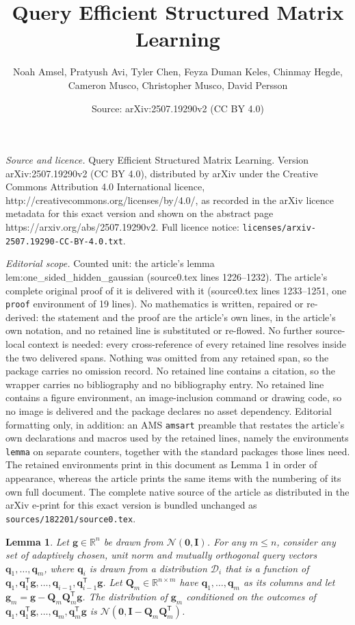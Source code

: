 \documentclass[10pt,a4paper]{amsart}
\title{Query Efficient Structured Matrix Learning}
\author{Noah Amsel, Pratyush Avi, Tyler Chen, Feyza Duman Keles, Chinmay Hegde, Cameron Musco, Christopher Musco, David Persson}
\date{Source: arXiv:2507.19290v2 (CC BY 4.0)}
\newtheorem{lemma}{Lemma}
\newcommand{\R}{\mathbb{R}}
\newcommand{\bv}[1]{\boldsymbol{\mathbf{#1}}}
\newcommand{\transpose}{\mathsf{T}}
\begin{document}
\maketitle

\noindent\emph{Source and licence.} Query Efficient Structured Matrix Learning. Version arXiv:2507.19290v2 (CC BY 4.0), distributed by arXiv under the Creative Commons Attribution 4.0 International licence, http://creativecommons.org/licenses/by/4.0/, as recorded in the arXiv licence metadata for this exact version and shown on the abstract page https://arxiv.org/abs/2507.19290v2. Full licence notice: \texttt{licenses/arxiv-2507.19290-CC-BY-4.0.txt}.\par\smallskip

\noindent\textit{Editorial scope.} Counted unit: the article's lemma lem:one\_sided\_hidden\_gaussian (source0.tex lines 1226--1232). The article's complete original proof of it is delivered with it (source0.tex lines 1233--1251, one \texttt{proof} environment of 19 lines). No mathematics is written, repaired or re-derived: the statement and the proof are the article's own lines, in the article's own notation, and no retained line is substituted or re-flowed.  No further source-local context is needed: every cross-reference of every retained line resolves inside the two delivered spans.  Nothing was omitted from any retained span, so the package carries no omission record.  No retained line contains a citation, so the wrapper carries no bibliography and no bibliography entry.  No retained line contains a figure environment, an image-inclusion command or drawing code, so no image is delivered and the package declares no asset dependency.  Editorial formatting only, in addition: an AMS \texttt{amsart} preamble that restates the article's own declarations and macros used by the retained lines, namely the environments \texttt{lemma} on separate counters, together with the standard packages those lines need.  The retained environments print in this document as Lemma 1 in order of appearance, whereas the article prints the same items with the numbering of its own full document.  The complete native source of the article as distributed in the arXiv e-print for this exact version is bundled unchanged as \texttt{sources/182201/source0.tex}.
\begin{lemma}
\label{lem:one_sided_hidden_gaussian}
Let $\bv{g} \in \R^n$ be drawn from $\mathcal{N}(\bv 0,\bv I)$. For any $m \leq n$, consider any set of adaptively chosen, unit norm and mutually orthogonal query vectors $\bv{q}_1, \ldots, \bv{q}_m$, where $\bv{q}_i$ is drawn from a distribution $\mathcal{D}_i$ that is a function of $\bv{q}_1, \bv{q}_1^\transpose \bv{g}, \ldots, \bv{q}_{i-1}, \bv{q}_{i-1}^\transpose \bv{g}$.
Let $\bv{Q}_m \in \R^{n \times m}$ have $\bv q_1,\ldots,\bv q_m$ as its columns and let $\bv{g}_m = \bv{g} - \bv{Q}_m\bv{Q}_m^\transpose \bv{g}$.
The distribution of $\bv{g}_m$ conditioned on the outcomes of 
$\bv{q}_1, \bv{q}_1^\transpose \bv{g}, \ldots, \bv{q}_{m}, \bv{q}_{m}^\transpose \bv{g}$ is $\mathcal{N}(\bv{0}, \bv{I} - \bv{Q}_m\bv{Q}_m^\transpose)$.
\end{lemma}
\end{document}
